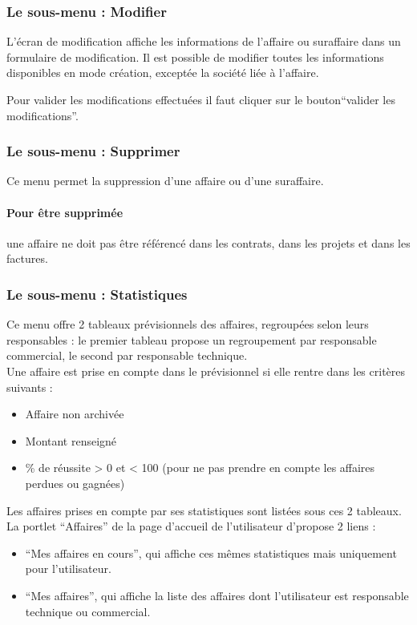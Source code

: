 \subsubsection{Le sous-menu : Modifier}

L'écran de modification affiche les informations de l'affaire ou suraffaire dans un formulaire de modification.
Il est possible de modifier toutes les informations disponibles en mode création, exceptée la société liée à l'affaire.

Pour valider les modifications effectuées il faut cliquer sur le bouton``valider les modifications''.


\subsubsection{Le sous-menu : Supprimer}
Ce menu permet la suppression d'une affaire ou d'une suraffaire.

\paragraph{Pour être supprimée} une affaire ne doit pas être référencé dans les contrats, dans les projets et dans les factures.


\subsubsection{Le sous-menu : Statistiques}

Ce menu offre 2 tableaux prévisionnels des affaires, regroupées selon leurs responsables : le premier tableau propose un regroupement par responsable commercial, le second par responsable technique.\\

Une affaire est prise en compte dans le prévisionnel si elle rentre dans les critères suivants :
\begin{itemize}
\item Affaire non archivée
\item Montant renseigné
\item \% de réussite > 0 et < 100 (pour ne pas prendre en compte les affaires perdues ou gagnées)
\end{itemize}
\vspace{0.3cm}

Les affaires prises en compte par ses statistiques sont listées sous ces 2 tableaux.\\

La portlet ``Affaires'' de la page d'accueil de l'utilisateur d'\obm propose 2 liens : 
\begin{itemize}
\item ``Mes affaires en cours'', qui affiche ces mêmes statistiques mais uniquement pour l'utilisateur.
\item ``Mes affaires'', qui affiche la liste des affaires dont l'utilisateur est responsable technique ou commercial.
\end{itemize}



